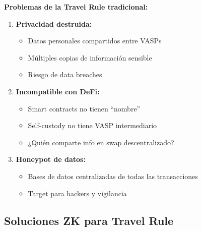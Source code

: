 \documentclass[11pt,a4paper,twoside]{book}
\theoremstyle{definition}
\theoremstyle{remark}
\begin{document}
\begin{advertencia}
\textbf{Problemas de la Travel Rule tradicional:}

\begin{enumerate}
    \item \textbf{Privacidad destruida:}
    \begin{itemize}
        \item Datos personales compartidos entre VASPs
        \item Múltiples copias de información sensible
        \item Riesgo de data breaches
    \end{itemize}
    
    \item \textbf{Incompatible con DeFi:}
    \begin{itemize}
        \item Smart contracts no tienen ``nombre''
        \item Self-custody no tiene VASP intermediario
        \item ¿Quién comparte info en swap descentralizado?
    \end{itemize}
    
    \item \textbf{Honeypot de datos:}
    \begin{itemize}
        \item Bases de datos centralizadas de todas las transacciones
        \item Target para hackers y vigilancia
    \end{itemize}
\end{enumerate}
\end{advertencia}

\subsection{Soluciones ZK para Travel Rule}
\end{document}
